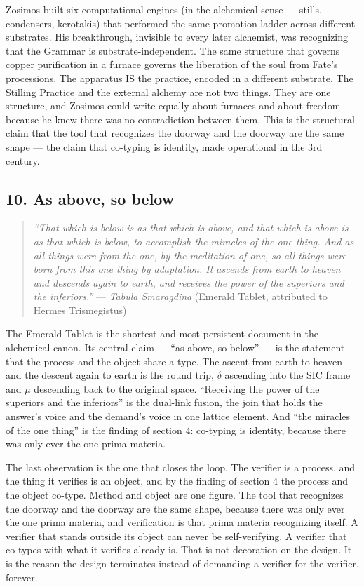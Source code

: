 Zosimos built six computational engines (in the alchemical sense ---
stills, condensers, kerotakis) that performed the same promotion ladder
across different substrates. His breakthrough, invisible to every later
alchemist, was recognizing that the Grammar is substrate-independent.
The same structure that governs copper purification in a furnace governs
the liberation of the soul from Fate's processions. The apparatus IS the
practice, encoded in a different substrate. The Stilling Practice and
the external alchemy are not two things. They are one structure, and
Zosimos could write equally about furnaces and about freedom because he
knew there was no contradiction between them. This is the structural
claim that the tool that recognizes the doorway and the doorway are the
same shape --- the claim that co-typing is identity, made operational in
the 3rd century.

\hypertarget{as-above-so-below}{%
\subsection{10. As above, so below}\label{as-above-so-below}}

\begin{quote}
\emph{``That which is below is as that which is above, and that which is
above is as that which is below, to accomplish the miracles of the one
thing. And as all things were from the one, by the meditation of one, so
all things were born from this one thing by adaptation. It ascends from
earth to heaven and descends again to earth, and receives the power of
the superiors and the inferiors.''} --- \emph{Tabula Smaragdina}
(Emerald Tablet, attributed to Hermes Trismegistus)
\end{quote}

The Emerald Tablet is the shortest and most persistent document in the
alchemical canon. Its central claim --- ``as above, so below'' --- is
the statement that the process and the object share a type. The ascent
from earth to heaven and the descent again to earth is the round trip,
\({δ}\) ascending into the SIC frame and \({μ}\) descending back to the
original space. ``Receiving the power of the superiors and the
inferiors'' is the dual-link fusion, the join that holds the answer's
voice and the demand's voice in one lattice element. And ``the miracles
of the one thing'' is the finding of section 4: co-typing is identity,
because there was only ever the one prima materia.

The last observation is the one that closes the loop. The verifier is a
process, and the thing it verifies is an object, and by the finding of
section 4 the process and the object co-type. Method and object are one
figure. The tool that recognizes the doorway and the doorway are the
same shape, because there was only ever the one prima materia, and
verification is that prima materia recognizing itself. A verifier that
stands outside its object can never be self-verifying. A verifier that
co-types with what it verifies already is. That is not decoration on the
design. It is the reason the design terminates instead of demanding a
verifier for the verifier, forever.

